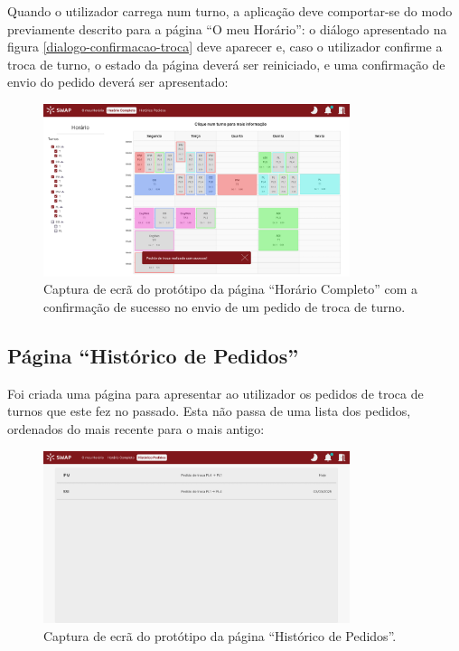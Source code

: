 \documentclass[12pt, a4paper]{article}
\begin{document}
Quando o utilizador carrega num turno, a aplicação deve comportar-se do modo previamente descrito
para a página ``O meu Horário'': o diálogo apresentado na figura \ref{dialogo-confirmacao-troca}
deve aparecer e, caso o utilizador confirme a troca de turno, o estado da página deverá ser
reiniciado, e uma confirmação de envio do pedido deverá ser apresentado:

\begin{figure}[H]
    \centering
    \includegraphics[width=0.8\textwidth]{res/prototype/horario-completo-toast-sucesso-troca.png}
    \caption{
        \onehalfspacing
        Captura de ecrã do protótipo da página ``Horário Completo'' com a confirmação de sucesso no
        envio de um pedido de troca de turno.
    }
    \label{horario-completo-toast-sucesso-troca}
\end{figure}

\subsection{Página ``Histórico de Pedidos''}

Foi criada uma página para apresentar ao utilizador os pedidos de troca de turnos que este fez no
passado. Esta não passa de uma lista dos pedidos, ordenados do mais recente para o mais antigo:

\begin{figure}[H]
    \centering
    \includegraphics[width=0.8\textwidth]{res/prototype/historico-de-pedidos.png}
    \caption{Captura de ecrã do protótipo da página ``Histórico de Pedidos''.}
    \label{historico-de-pedidos}
\end{figure}
\end{document}
